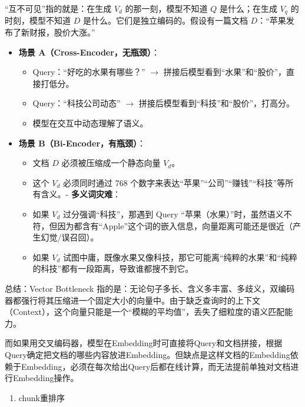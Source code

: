 ``互不可见''指的就是：在生成 \(V_d\) 的那一刻，模型不知道 \(Q\) 是什么；在生成 \(V_q\) 的时刻，模型不知道 \(D\) 是什么。它们是独立编码的。假设有一篇文档 \(D\)：``苹果发布了新财报，股价大涨。''

\begin{itemize}
\tightlist
\item
{}
  \textbf{场景 A（Cross-Encoder，无瓶颈）}：

  \begin{itemize}
  \tightlist
  \item
    Query：``好吃的水果有哪些？'' \(\to\) 拼接后模型看到``水果''和``股价''，直接打低分。
  \item
    Query：``科技公司动态'' \(\to\) 拼接后模型看到``科技''和``股价''，打高分。
  \item
    模型在交互中动态理解了语义。
  \end{itemize}
\item
{}
  \textbf{场景 B（Bi-Encoder，有瓶颈）}：

  \begin{itemize}
  \tightlist
  \item
    文档 \(D\) 必须被压缩成一个静态向量 \(V_d\)。
  \item
{}
    这个 \(V_d\) 必须同时通过 768 个数字来表达``苹果''``公司''``赚钱''``科技''等所有含义。- \textbf{多义词灾难}：
  \item
    如果 \(V_d\) 过分强调``科技''，那遇到 Query ``苹果（水果）''时，虽然语义不符，但因为都含有``Apple''这个词的嵌入信息，向量距离可能还是很近（产生幻觉/误召回）。
  \item
    如果 \(V_d\) 试图中庸，既像水果又像科技，那它可能离``纯粹的水果''和``纯粹的科技''都有一段距离，导致谁都搜不到它。
  \end{itemize}
\end{itemize}

总结：Vector Bottleneck 指的是：无论句子多长、含义多丰富、多歧义，双编码器都强行将其压缩进一个固定大小的向量中。由于缺乏查询时的上下文（Context），这个向量只能是一个``模糊的平均值''，丢失了细粒度的语义匹配能力。

而如果用交叉编码器，模型在Embedding时可直接将Query和文档拼接，根据Query确定把文档的哪些内容放进Embedding。但缺点是这样文档的Embedding依赖于Embedding，必须在每次给出Query后都在线计算，而无法提前单独对文档进行Embedding操作。

\begin{enumerate}
\def\labelenumi{\arabic{enumi}.}
\setcounter{enumi}{1}
\tightlist
\item
  chunk重排序
\end{enumerate}

